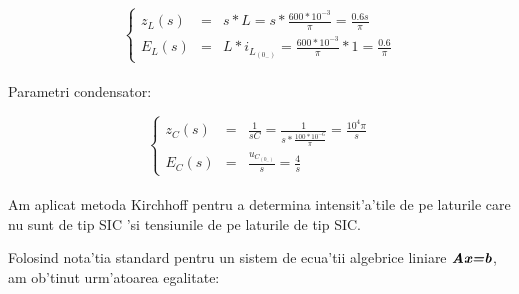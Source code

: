 \documentclass[titlepage, a4paper,12pt]{article}
\begin{document}
\begin{equation}
\left\{
\begin{array}{ccl}
z_L(s) & = & s*L = s * \frac{600 * 10^{-3}}{\pi}= \frac{0.6s}{\pi} \\
E_L(s) & = & L * i_{L_{(0_-)}} = \frac{600 * 10^{-3}}{\pi} * 1 = \frac{0.6}{\pi}
\end{array}  
\right. \nonumber %
\end{equation} \\

Parametri condensator:

\begin{equation}
\left\{
\begin{array}{ccl}
z_C(s) & = & \frac{1}{sC} = \frac{1}{s * \frac{100 * 10^{-6}}{\pi}}= \frac{10^{4}\pi}{s} \\
E_C(s) & = & \frac{u_{C_{(0_-)}}}{s} = \frac{4}{s}
\end{array}  
\right. \nonumber %
\end{equation} \\

Am aplicat metoda Kirchhoff pentru a determina intensit'a'tile de pe laturile care nu sunt de tip SIC 'si tensiunile de pe laturile de tip SIC.

Folosind nota'tia standard pentru un sistem de ecua'tii algebrice liniare $\textbf{\textit{Ax=b}}$, am ob'tinut urm'atoarea egalitate:
\end{document}
